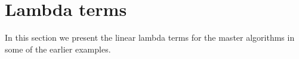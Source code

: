 \documentclass[english,letter paper,12pt,leqno]{article}
\theoremstyle{example}
\newtheorem{example}[theorem]{Example}
\numberwithin{equation}{section}
\begin{document}

\appendix

\section{Lambda terms}\label{section:lambda_terms}

In this section we present the linear lambda terms for the master algorithms in some of the earlier examples.
\end{document}
